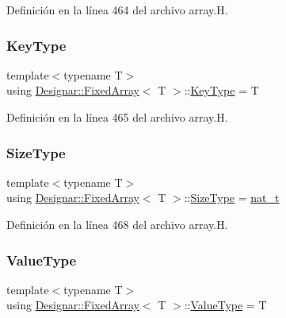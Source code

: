 Definición en la línea 464 del archivo array.\+H.

\mbox{\label{class_designar_1_1_fixed_array_a3a725cf21783340b8aca29dd1db0acf0}} 
\subsubsection{\texorpdfstring{Key\+Type}{KeyType}}
{\footnotesize\ttfamily template$<$typename T$>$ \\
using \hyperlink{class_designar_1_1_fixed_array}{Designar\+::\+Fixed\+Array}$<$ T $>$\+::\hyperlink{class_designar_1_1_fixed_array_a3a725cf21783340b8aca29dd1db0acf0}{Key\+Type} =  T}



Definición en la línea 465 del archivo array.\+H.

\mbox{\label{class_designar_1_1_fixed_array_a503ae414cc313d248e77c08e62ef043c}} 
\subsubsection{\texorpdfstring{Size\+Type}{SizeType}}
{\footnotesize\ttfamily template$<$typename T$>$ \\
using \hyperlink{class_designar_1_1_fixed_array}{Designar\+::\+Fixed\+Array}$<$ T $>$\+::\hyperlink{class_designar_1_1_fixed_array_a503ae414cc313d248e77c08e62ef043c}{Size\+Type} =  \hyperlink{namespace_designar_aa72662848b9f4815e7bf31a7cf3e33d1}{nat\+\_\+t}}



Definición en la línea 468 del archivo array.\+H.

\mbox{\label{class_designar_1_1_fixed_array_ac1cfeb4403a2dcbffd7ef494e5b873d0}} 
\subsubsection{\texorpdfstring{Value\+Type}{ValueType}}
{\footnotesize\ttfamily template$<$typename T$>$ \\
using \hyperlink{class_designar_1_1_fixed_array}{Designar\+::\+Fixed\+Array}$<$ T $>$\+::\hyperlink{class_designar_1_1_fixed_array_ac1cfeb4403a2dcbffd7ef494e5b873d0}{Value\+Type} =  T}



